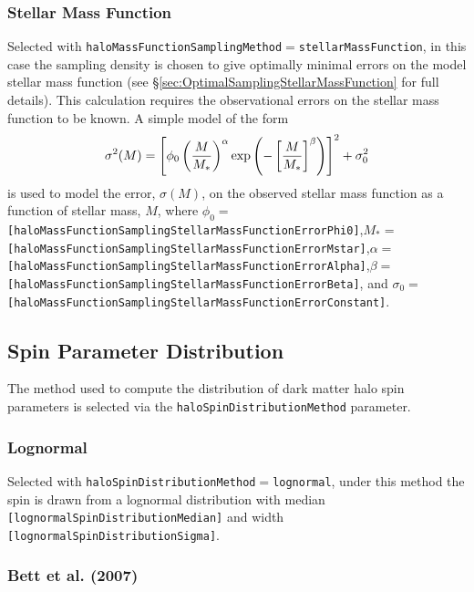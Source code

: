 \subsubsection{Stellar Mass Function}

Selected with {\tt haloMassFunctionSamplingMethod}$=${\tt stellarMassFunction}, in this case the sampling density is chosen to give optimally minimal errors on the model stellar mass function (see \S\ref{sec:OptimalSamplingStellarMassFunction} for full details). This calculation requires the observational errors on the stellar mass function to be known. A simple model of the form
\begin{equation}
 \sigma^2(M) = \left[\phi_0 \left({M\over M_*}\right)^\alpha \exp\left(-\left[{M\over M_*}\right]^\beta\right)\right]^2 + \sigma_0^2
\end{equation}
is used to model the error, $\sigma(M)$, on the observed stellar mass function as a function of stellar mass, $M$, where $\phi_0=${\tt [haloMassFunctionSamplingStellarMassFunctionErrorPhi0]},$M_*=${\tt [haloMassFunctionSamplingStellarMassFunctionErrorMstar]},$\alpha=${\tt [haloMassFunctionSamplingStellarMassFunctionErrorAlpha]},$\beta=${\tt [haloMassFunctionSamplingStellarMassFunctionErrorBeta]}, and $\sigma_0=${\tt [haloMassFunctionSamplingStellarMassFunctionErrorConstant]}.

\subsection{Spin Parameter Distribution}\label{sec:SpinParameterDistribution}

The method used to compute the distribution of dark matter halo spin parameters is selected via the {\tt haloSpinDistributionMethod} parameter.

\subsubsection{Lognormal}

Selected with {\tt haloSpinDistributionMethod}$=${\tt lognormal}, under this method the spin is drawn from a lognormal distribution with median {\tt [lognormalSpinDistributionMedian]} and width {\tt [lognormalSpinDistributionSigma]}.

\subsubsection{Bett et al. (2007)}

